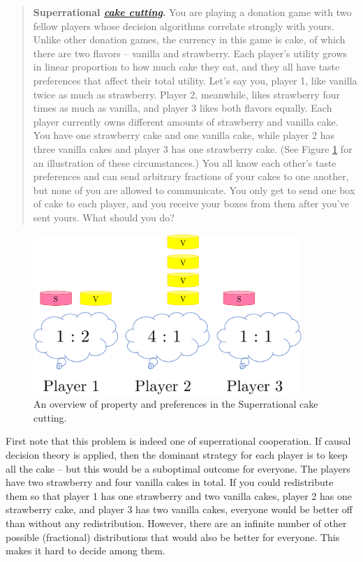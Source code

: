 \begin{quote}
\textbf{Superrational
\href{https://en.wikipedia.org/wiki/Fair_cake-cutting}{\emph{cake
cutting}}.} You are playing a donation game with two fellow players
whose decision algorithms correlate strongly with yours. Unlike other
donation games, the currency in this game is cake, of which there are
two flavors -- vanilla and strawberry. Each player's utility grows in
linear proportion to how much cake they eat, and they all have taste
preferences that affect their total utility. Let's say you, player 1,
like vanilla twice as much as strawberry. Player 2, meanwhile, likes
strawberry four times as much as vanilla, and player 3 likes both
flavors equally. Each player currently owns different amounts of
strawberry and vanilla cake. You have one strawberry cake and one
vanilla cake, while player 2 has three vanilla cakes and player 3 has
one strawberry cake. (See Figure
\ref{Superrational-cake-cutting} for an illustration of
these circumstances.) You all know each other's taste preferences and
can send arbitrary fractions of your cakes to one another, but none of
you are allowed to communicate. You only get to send one box of cake to
each player, and you receive your boxes from them after you've sent
yours. What should you do?
\end{quote}

\begin{figure}[h!]
    \centering
    \includegraphics[width=4in]{figs/Superrational-cake-cutting}
    \caption{An overview of property and preferences in the Superrational cake cutting.}
    \label{Superrational-cake-cutting}
\end{figure}

First note that this problem is indeed one of superrational cooperation.
If causal decision theory is applied, then the dominant strategy for
each player is to keep all the cake -- but this would be a suboptimal
outcome for everyone. The players have two strawberry and four vanilla
cakes in total. If you could redistribute them so that player 1 has one
strawberry and two vanilla cakes, player 2 has one strawberry cake, and
player 3 has two vanilla cakes, everyone would be better off than
without any redistribution. However, there are an infinite number of
other possible (fractional) distributions that would also be better for
everyone. This makes it hard to decide among them.

